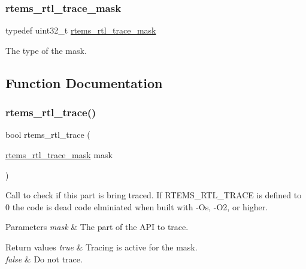 \subsubsection{\texorpdfstring{rtems\_rtl\_trace\_mask}{rtems\_rtl\_trace\_mask}}
{\footnotesize\ttfamily typedef uint32\+\_\+t \mbox{\hyperlink{rtl-trace_8h_a5cfd053d8ebf1ee26e60b11ce50cc521}{rtems\+\_\+rtl\+\_\+trace\+\_\+mask}}}

The type of the mask. 

\subsection{Function Documentation}
\mbox{\label{rtl-trace_8h_ac04c6d098f19ac5fae73682e2f279e38}} 
\subsubsection{\texorpdfstring{rtems\_rtl\_trace()}{rtems\_rtl\_trace()}}
{\footnotesize\ttfamily bool rtems\+\_\+rtl\+\_\+trace (\begin{DoxyParamCaption}\item[{\mbox{\hyperlink{rtl-trace_8h_a5cfd053d8ebf1ee26e60b11ce50cc521}{rtems\+\_\+rtl\+\_\+trace\+\_\+mask}}}]{mask }\end{DoxyParamCaption})}

Call to check if this part is bring traced. If R\+T\+E\+M\+S\+\_\+\+R\+T\+L\+\_\+\+T\+R\+A\+CE is defined to 0 the code is dead code elminiated when built with -\/Os, -\/O2, or higher.


\begin{DoxyParams}{Parameters}
{\em mask} & The part of the A\+PI to trace. \\
\hline
\end{DoxyParams}

\begin{DoxyRetVals}{Return values}
{\em true} & Tracing is active for the mask. \\
\hline
{\em false} & Do not trace. \\
\hline
\end{DoxyRetVals}
\mbox{\label{rtl-trace_8h_a9f47ce79badafef2b3e1fb3806a12809}} 
